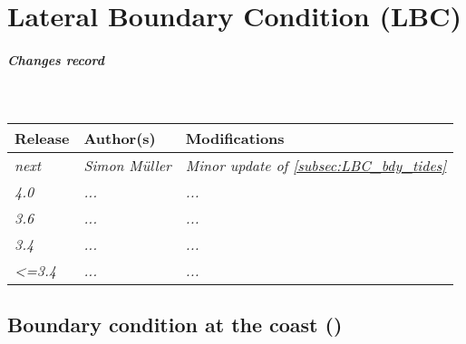 \documentclass[../main/NEMO_manual]{subfiles}
\begin{document}
\chapter{Lateral Boundary Condition (LBC)}
\label{chap:LBC}

\chaptertoc

\paragraph{Changes record} ~\\

{\footnotesize
  \begin{tabularx}{\textwidth}{l||X|X}
    Release & Author(s) & Modifications \\
    \hline
    {\em  next} & {\em Simon M{\" u}ller} & {\em Minor update of \autoref{subsec:LBC_bdy_tides}} \\[2mm]
    {\em   4.0} & {\em ...} & {\em ...} \\
    {\em   3.6} & {\em ...} & {\em ...} \\
    {\em   3.4} & {\em ...} & {\em ...} \\
    {\em <=3.4} & {\em ...} & {\em ...}
  \end{tabularx}
}

\clearpage


\section[Boundary condition at the coast (\forcode{rn_shlat})]{Boundary condition at the coast (\protect{})}
\label{sec:LBC_coast}

\begin{listing}
  \caption{}
  \label{lst:namlbc}
\end{listing}


\end{document}
